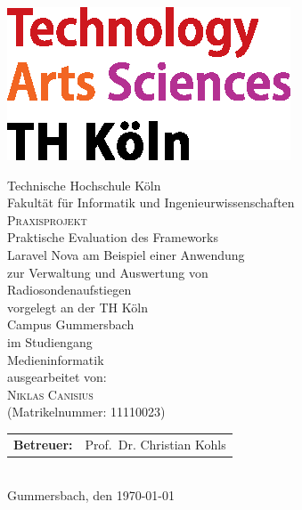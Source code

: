 \pagestyle{empty}
\begin{titlepage}
    \includegraphics[scale=1.0]{assets/logo_TH-Koeln_CMYK_22pt}\\
    \begin{center}
        \large
        Technische Hochschule Köln\\
        Fakultät für Informatik und Ingenieurwissenschaften\\
        \vspace{1cm}
        \large
        \textsc{Praxisprojekt}\\
        \vspace{1cm}
        \huge
        Praktische Evaluation des Frameworks\\
        Laravel Nova am Beispiel einer Anwendung\\
        zur Verwaltung und Auswertung von\\
        Radiosondenaufstiegen\\
        \vspace{1cm}
        \large
        vorgelegt an der TH Köln\\
        Campus Gummersbach\\
        im Studiengang\\
        Medieninformatik\\
        \vspace{1cm}
        ausgearbeitet von:\\
        \textsc{Niklas Canisius}\\
        (Matrikelnummer: 11110023)\\
        \vspace{1cm}
        \begin{tabular}{ll}
            \textbf{Betreuer:} & Prof.\ Dr. Christian Kohls \\
        \end{tabular}
        \vspace{1cm}
        \\Gummersbach, den \today
    \end{center}
\end{titlepage}
